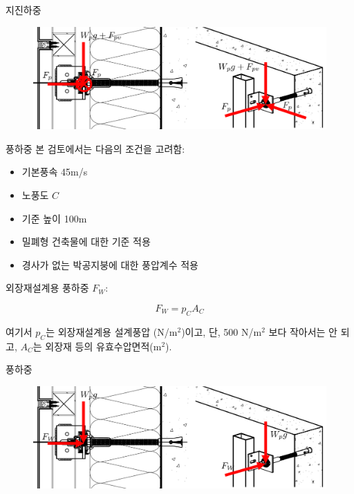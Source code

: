 \documentclass[9pt]{beamer}
\begin{document}
	\begin{frame}{지진하중}
	\begin{figure}
\includegraphics[height=.40\textheight]{image06}
\end{figure}
	\end{frame}
	\begin{frame}{풍하중}
	본 검토에서는 다음의 조건을 고려함:  

\begin{itemize}
	\item 기본풍속 45m/s
	\item 노풍도 $C$
	\item 기준 높이 100m
	\item 밀폐형 건축물에 대한 기준 적용
	\item 경사가 없는 박공지붕에 대한 풍압계수 적용
\end{itemize}

외장재설계용 풍하중 $F_W$:

\begin{equation}
	F_W = p_C A_C
\end{equation}
 
\noindent 여기서 $p_C$는 외장재설계용 설계풍압 (N/m$^2$)이고, 단, 500 N/m$^2$ 보다 작아서는 안 되고, $A_C$는 외장재 등의 유효수압면적(m$^2$). 
	\end{frame}
	\begin{frame}{풍하중}
		\begin{figure}
\includegraphics[height=.40\textheight]{image07}
\end{figure}
	\end{frame}
\end{document}
